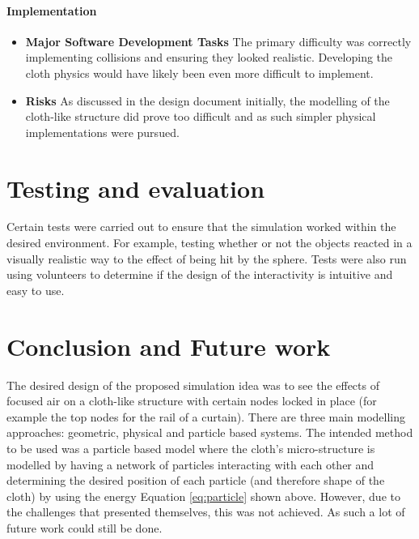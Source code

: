 \documentclass[conference,backref=page]{acmsiggraph}
\begin{document}
\paragraph{Implementation}

\begin{itemize}
\item  {\bf Major Software Development Tasks} The primary difficulty was correctly implementing collisions and ensuring they looked realistic. Developing the cloth physics would have likely been even more difficult to implement.
\item {\bf Risks} As discussed in the design document initially, the modelling of the cloth-like structure did prove too difficult and as such simpler physical implementations were pursued.
\end{itemize}

\section{Testing and evaluation}
Certain tests were carried out to ensure that the simulation worked within the desired environment. For example, testing whether or not the objects reacted in a visually realistic way to the effect of being hit by the sphere. Tests were also run using volunteers to determine if the design of the interactivity is intuitive and easy to use.


\section{Conclusion and Future work}
The desired design of the proposed simulation idea was to see the effects of focused air on a cloth-like structure with certain nodes locked in place (for example the top nodes for the rail of a curtain). There are three main modelling approaches: geometric, physical and particle based systems. The intended method to be used was a particle based model where the cloth's micro-structure is modelled by having a network of particles interacting with each other and determining the desired position of each particle (and therefore shape of the cloth) by using the energy Equation \ref{eq:particle} shown above. However, due to the challenges that presented themselves, this was not achieved. As such a lot of future work could still be done.






\end{document}
